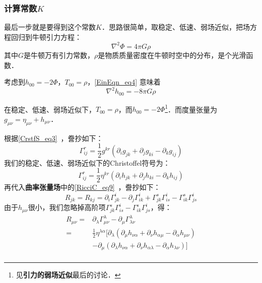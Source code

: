 \subsubsection{计算常数$K$}


最后一步就是要得到这个常数$K$．思路很简单，取稳定、低速、弱场近似，把场方程回归到牛顿引力方程：
\begin{equation}\label{EinEqn_eq4}
\nabla^2\Phi=4\pi G\rho
\end{equation}
其中$G$是牛顿万有引力常数，$\rho$是物质质量密度在牛顿时空中的分布，是个光滑函数．

考虑到$h_{00}=-2\Phi$，$T_{00}=\rho$，\autoref{EinEqn_eq4} 意味着
\begin{equation}
\nabla^2h_{00}=-8\pi G\rho
\end{equation}





在稳定、低速、弱场近似下，$T_{00}=\rho$，而$h_{00}=-2\Phi$\footnote{见\textbf{引力的弱场近似}最后的讨论．}．而度量张量为$g_{\mu\nu}=\eta_{\mu\nu}+h_{\mu\nu}$．



根据\autoref{CrstfS_eq3}~，誊抄如下：
\begin{equation}
\Gamma^{r}_{ij}=\frac{1}{2}g^{kr}(\partial_ig_{jk}+\partial_jg_{ki}-\partial_kg_{ij})
\end{equation}
我们的稳定、低速、弱场近似下的Christoffel符号为：
\begin{equation}
\Gamma^{r}_{ij}=\frac{1}{2}\eta^{kr}(\partial_ih_{jk}+\partial_jh_{ki}-\partial_kh_{ij})
\end{equation}
再代入\textbf{曲率张量场}中的\autoref{RicciC_eq9}~，誊抄如下：
\begin{equation}
R_{jk}=R_{kj}=\partial_i\Gamma^i_{jk}-\partial_j\Gamma^{i}_{ik}+\Gamma^s_{jk}\Gamma^i_{is}-\Gamma^s_{ik}\Gamma^i_{js}
\end{equation}
由于$h_{\mu\nu}$很小，我们忽略掉高阶项$\Gamma^s_{jk}\Gamma^i_{is}-\Gamma^s_{ik}\Gamma^i_{js}$，得：
\begin{equation}
\begin{aligned}
R_{\mu\nu}=&\partial_\lambda\Gamma^\lambda_{\mu\nu}-\partial_{\mu}\Gamma^\lambda_{\lambda\nu}\\
=&\frac{1}{2}\eta^{\lambda\alpha}[\partial_\lambda(\partial_\mu h_{\nu \alpha}+\partial_\nu h_{\alpha\mu}-\partial_\alpha h_{\mu\nu})\\
&-\partial_\mu(\partial_\lambda h_{\nu\alpha}+\partial_\nu h_{\alpha\lambda}-\partial_\alpha h_{\lambda\nu})]\\
\end{aligned}
\end{equation}

